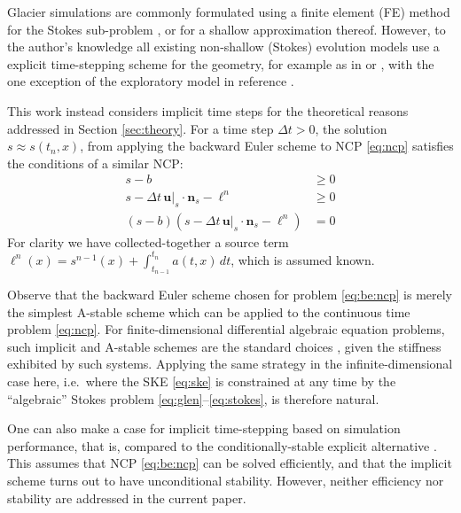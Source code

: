 \documentclass[hidelinks,onefignum,onetabnum,final]{siamart220329}  %
\newcommand{\bn}{\mathbf{n}}
\newcommand{\bu}{\mathbf{u}}
\begin{document}
Glacier simulations are commonly formulated using a finite element (FE) method for the Stokes sub-problem \cite{IsaacStadlerGhattas2015,Jouvetetal2008,Pattynetal2008}, or for a shallow approximation thereof.  However, to the author's knowledge all existing non-shallow (Stokes) evolution models use a explicit time-stepping scheme for the geometry, for example as in \cite{Jouvetetal2008} or \cite{LofgrenAhlkronaHelanow2022}, with the one exception of the exploratory model in reference \cite{WirbelJarosch2020}.

This work instead considers implicit time steps for the theoretical reasons addressed in Section \ref{sec:theory}.  For a time step $\Delta t > 0$, the solution $s\approx s(t_n,x)$, from applying the backward Euler scheme to NCP \eqref{eq:ncp} satisfies the conditions of a similar NCP:
\begin{subequations}
\label{eq:be:ncp}
\begin{align}
s - b &\ge 0 \label{eq:be:ncp:constraint} \\
s - \Delta t\,\bu|_s \cdot \bn_s - \ell^n &\ge 0 \label{eq:be:ncp:residualpos} \\
(s - b) \left(s - \Delta t\,\bu|_s \cdot \bn_s - \ell^n\right) &= 0 \label{eq:be:ncp:complementarity}
\end{align}
\end{subequations}
For clarity we have collected-together a source term $\ell^n(x) = s^{n-1}(x) + \int_{t_{n-1}}^{t_n} a(t,x)\,dt$, which is assumed known.

Observe that the backward Euler scheme chosen for problem \eqref{eq:be:ncp} is merely the simplest A-stable \cite{AscherPetzold1998} scheme which can be applied to the continuous time problem \eqref{eq:ncp}.  For finite-dimensional differential algebraic equation problems, such implicit and A-stable schemes are the standard choices \cite{AscherPetzold1998}, given the stiffness exhibited by such systems.  Applying the same strategy in the infinite-dimensional case here, i.e.~where the SKE \eqref{eq:ske} is constrained at any time by the ``algebraic'' Stokes problem \eqref{eq:glen}--\eqref{eq:stokes}, is therefore natural.

One can also make a case for implicit time-stepping based on simulation performance, that is, compared to the conditionally-stable explicit alternative \cite{Bueler2023}.  This assumes that NCP \eqref{eq:be:ncp} can be solved efficiently, and that the implicit scheme turns out to have unconditional stability.  However, neither efficiency nor stability are addressed in the current paper.
\end{document}
